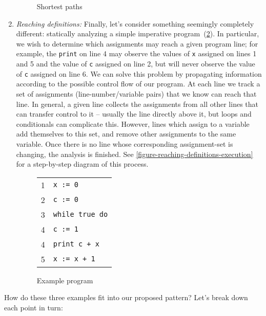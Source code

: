 \begin{enumerate}
\begin{figure}[pth]
  \XXX
  \caption{Shortest paths}
  \label{figure-shortest-paths}
\end{figure}


\item \emph{Reaching definitions:}
%
Finally, let's consider something seemingly completely different: statically
analyzing a simple imperative program~(\cref{figure-reaching-definitions}). In
particular, we wish to determine which assignments may reach a given program
line; for example, the \texttt{print} on line 4 may observe the values of
\texttt{x} assigned on lines 1 and 5 and the value of \texttt{c} assigned on
line 2, but will never observe the value of \texttt{c} assigned on line 6.
%
We can solve this problem by propagating information according to the possible control flow of our program.
%
At each line we track a set of assignments (line-number/variable pairs) that we
know can reach that line.
%
In general, a given line collects the assignments from all other lines that can transfer control to it -- usually the line directly above it, but loops and conditionals can complicate this.
%
However, lines which assign to a variable add themselves to this set, and remove other assignments to the same variable.
%
Once there is no line whose corresponding assignment-set is changing, the analysis is finished.
%
See \cref{figure-reaching-definitions-execution} for a step-by-step diagram of this process.

\begin{figure}[pth]
  \centering
  \ttfamily
  \begin{tabular}{cl}
    1 & \tt x := 0\\
    2 & \tt c := 0\\
    3 & \tt while true do\\
    4 & \tt\quad c := 1\\
    4 & \tt\quad print c + x\\
    5 & \tt\quad x := x + 1
  \end{tabular}
  \caption{Example program}
  \label{figure-reaching-definitions}
\end{figure}



\end{enumerate}

\vspace{\baselineskip}
\noindent
How do these three examples fit into our proposed pattern? Let's break down each point in turn:

